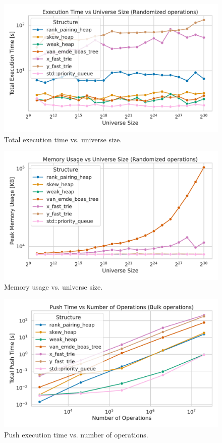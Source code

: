 \begin{figure}[H]
    \centering
    \includegraphics[width=1.0\textwidth]{figures/plots/plot_universe_vs_time.pdf}
    \caption{Total execution time vs. universe size.}
    \label{fig:execution_time}
\end{figure}

\begin{figure}[H]
    \centering
    \includegraphics[width=1.0\textwidth]{figures/plots/plot_universe_vs_memory.pdf}
    \caption{Memory usage vs. universe size.}
    \label{fig:execution_time}
\end{figure}

\begin{figure}[H]
    \centering
    \includegraphics[width=1.0\textwidth]{figures/plots/plot_bulk_push.pdf}
    \caption{Push execution time vs. number of operations.}
    \label{fig:execution_time}
\end{figure}

